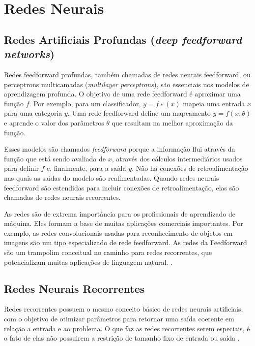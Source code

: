 \documentclass[12pt]{article}
\begin{document}
\section{Redes Neurais} \label{sec:revisao}
\subsection{Redes Artificiais Profundas (\textit{deep feedforward networks})}

Redes feedforward profundas, também chamadas de redes neurais feedforward, ou perceptrons multicamadas (\textit{multilayer perceptrons}), são essenciais nos modelos de aprendizagem profunda. O objetivo de uma rede feedforward é aproximar uma função $f$. Por exemplo, para um classificador, $y = f ∗ (x)$ mapeia uma entrada $x$ para uma categoria $y$. Uma rede feedforward define um mapeamento $y = f (x; θ)$ e aprende o valor dos parâmetros $θ$ que resultam na melhor aproximação da função.

Esses modelos são chamados \textit{feedforward} porque a informação flui através da função que está sendo avaliada de $x$, através dos cálculos intermediários usados ​​para definir $f$ e, finalmente, para a saída $y$. Não há conexões de retroalimentação nas quais as saídas do modelo são realimentadas. Quando redes neurais feedforward são estendidas para incluir conexões de retroalimentação, elas são chamadas de redes neurais recorrentes.

As redes  são de extrema importância para os profissionais de aprendizado de máquina. Eles formam a base de muitas aplicações comerciais importantes. Por exemplo, as redes convolucionais usadas para reconhecimento de objetos em imagens são um tipo especializado de rede feedforward. As redes da Feedforward são um trampolim conceitual no caminho para redes recorrentes, que potencializam muitas aplicações de linguagem natural. \cite{Goodfellow-et-al-2016}.

\subsection{Redes Neurais Recorrentes}

Redes recorrentes possuem o mesmo conceito básico de redes neurais artificiais, com o objetivo de otimizar parâmetros para retornar uma saída coerente em relação a entrada e ao problema. O que faz as redes recorrentes serem especiais, é o fato de elas não possuirem a restrição de tamanho fixo de entrada ou saída \cite{karpathy:2015}.
\end{document}

